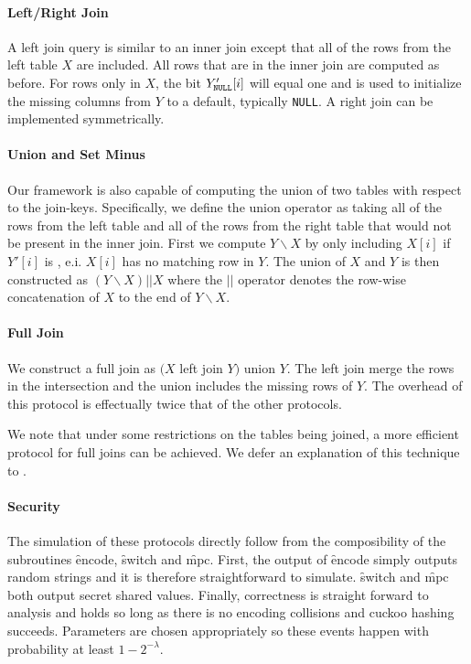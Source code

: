 \paragraph{Left/Right Join}

A left join query is similar to an inner join except that all of the rows from the left table $X$ are included. All rows that are in the inner join are computed as before. For rows only in $X$, the bit $Y_\texttt{NULL}'[i]$ will equal one and is used to initialize the missing columns from $Y$ to a default, typically \texttt{NULL}. A right join can be implemented symmetrically.

\paragraph{Union and Set Minus}

Our framework is also capable of computing the union of two tables with respect to the join-keys. Specifically, we define the union operator as taking all of the rows from the left table and all of the rows from the right table that would not be present in the inner join. First we compute $Y\backslash X$ by only including $X[i]$ if $Y'[i]$ is \Null, e.i. $X[i]$ has no matching row in $Y$. The union of $X$ and $Y$ is then constructed as $(Y\backslash X) || X$ where the $||$ operator denotes the row-wise concatenation of $X$ to the end of $Y\backslash X$.


\paragraph{Full Join}

We construct a full join as $(X$ left join $Y)$ union $Y$. The left join merge the rows in the intersection and the union includes the missing rows of $Y$. The overhead of this protocol is effectually twice that of the other protocols. 

We note that under some restrictions on the tables being joined, a more efficient protocol for full joins can be achieved. We defer an explanation of this technique to .

\paragraph{Security} The simulation of these protocols directly follow from the composibility of the subroutines \f{encode}, \f{switch} and \f{mpc}. First, the output of \f{encode} simply outputs random strings and it is therefore straightforward to simulate.  \f{switch} and \f{mpc} both output secret shared values. Finally, correctness is straight forward to analysis and holds so long as there is no encoding collisions and cuckoo hashing succeeds. Parameters are chosen appropriately so these events happen with probability at least $1-2^{-\lambda}$.

